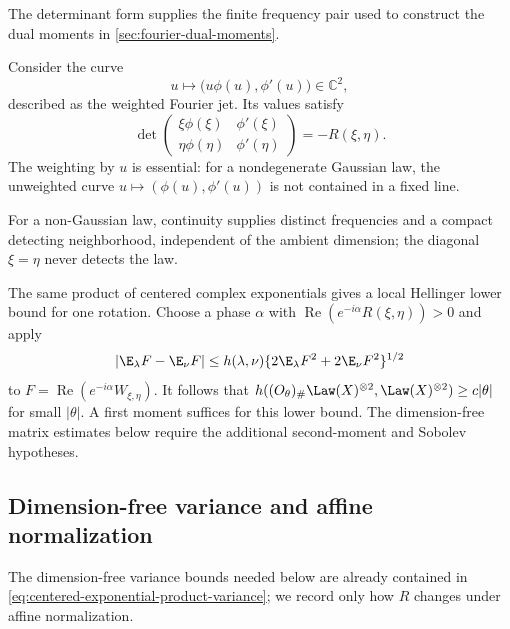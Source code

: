 The determinant form supplies the finite frequency pair used to construct the
dual moments in \cref{sec:fourier-dual-moments}.

Consider the curve
\[
 u\longmapsto\bigl(u\phi(u),\phi'(u)\bigr)\in\mathbb C^2,
\]
described as the weighted Fourier jet.  Its values satisfy
\begin{equation}
 \det\!\begin{pmatrix}
 \xi\phi(\xi)&\phi'(\xi)\\
 \eta\phi(\eta)&\phi'(\eta)
 \end{pmatrix}
 =-R(\xi,\eta).
 \label{eq:fourier-wedge}
\end{equation}
The weighting by \(u\) is essential: for a nondegenerate Gaussian law, the
unweighted curve \(u\mapsto(\phi(u),\phi'(u))\) is not contained in a fixed
line.

For a non-Gaussian law, continuity supplies distinct frequencies and a compact
detecting neighborhood, independent of the ambient dimension; the diagonal
\(\xi=\eta\) never detects the law.

The same product of centered complex exponentials gives a local Hellinger
lower bound for one rotation.
Choose a phase $\alpha$ with
$\operatorname{Re}(e^{-i\alpha}R(\xi,\eta))>0$ and apply
\[
 |\E_\lambda F-\E_\nu F|
 \le h(\lambda,\nu)
             \{2\E_\lambda F^2+2\E_\nu F^2\}^{1/2}
\]
to $F=\operatorname{Re}(e^{-i\alpha}W_{\xi,\eta})$.
It follows that
$h((O_\theta)_\#\Law(X)^{\otimes2},
\Law(X)^{\otimes2})\ge c|\theta|$ for small
$|\theta|$.
A first moment suffices for this lower bound.
The dimension-free matrix estimates below require the additional
second-moment and Sobolev hypotheses.

\subsection{Dimension-free variance and affine normalization}
\label{sec:variance-and-affine-normalization}

The dimension-free variance bounds needed below are already contained in
\eqref{eq:centered-exponential-product-variance}; we record only how \(R\)
changes under affine normalization.

